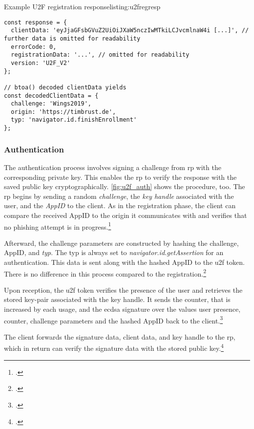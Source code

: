 \begin{example}{Example U2F registration response}{listing:u2fregresp}
\begin{verbatim}
const response = {
  clientData: 'eyJjaGFsbGVuZ2UiOiJXaW5nczIwMTkiLCJvcmlnaW4i [...]', // further data is omitted for readability
  errorCode: 0,
  registrationData: '...', // omitted for readability
  version: 'U2F_V2'
};

// btoa() decoded clientData yields
const decodedClientData = {
  challenge: 'Wings2019',
  origin: 'https://timbrust.de',
  typ: 'navigator.id.finishEnrollment'
};
\end{verbatim}
\end{example}

\subsubsection{Authentication}

The authentication process involves signing a challenge from \gls{rp} with the corresponding private key. This enables the \gls{rp} to verify the response with the saved public key cryptographically. \autoref{fig:u2f_auth} shows the procedure, too. The \gls{rp} begins by sending a random \textit{challenge}, the \textit{key handle} associated with the user, and the \textit{AppID} to the client. As in the registration phase, the client can compare the received AppID to the origin it communicates with and verifies that no phishing attempt is in progress.\footcites[See][3]{7860546}[See][6]{u2f-js-api}

Afterward, the challenge parameters are constructed by hashing the challenge, AppID, and \textit{typ}. The typ is always set to \textit{navigator.id.getAssertion} for an authentication. This data is sent along with the hashed AppID to the \gls{u2f} token. There is no difference in this process compared to the registration.\footcites[See][6]{u2f-raw-message}

Upon reception, the \gls{u2f} token verifies the presence of the user and retrieves the stored key-pair associated with the key handle. It sends the counter, that is increased by each usage, and the \gls{ecdsa} signature over the values user presence, counter, challenge parameters and the hashed AppID back to the client.\footcites[431]{10.1007/978-3-662-54970-4_25}[See][7]{u2f-raw-message}

The client forwards the signature data, client data, and key handle to the \gls{rp}, which in return can verify the signature data with the stored public key.\footcites[See][118]{IdentityandDataSecurityforWebDevelopment}

